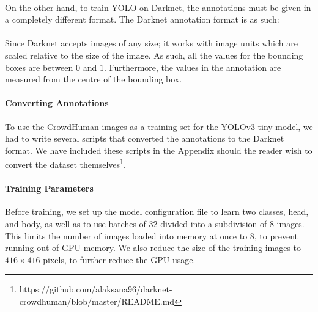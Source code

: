 \paragraph{}  

\paragraph{}On the other hand, to train YOLO on Darknet, the annotations must be given in a completely different format. The Darknet annotation format is as such:

\paragraph{}

\paragraph{}Since Darknet accepts images of any size; it works with image units which are scaled relative to the size of the image. As such, all the values for the bounding boxes are between $0$ and $1$. Furthermore, the  values in the annotation are measured from the centre of the bounding box.  

\paragraph{Converting Annotations} To use the CrowdHuman images as a training set for the YOLOv3-tiny model, we had to write several scripts that converted the annotations to the Darknet format. We have included these scripts in the Appendix should the reader wish to convert the dataset themselves\footnote{https://github.com/alaksana96/darknet-crowdhuman/blob/master/README.md}.

\paragraph{Training Parameters} Before training, we set up the model configuration file to learn two classes, head, and body, as well as to use batches of 32 divided into a subdivision of 8 images. This limits the number of images loaded into memory at once to 8, to prevent running out of GPU memory. We also reduce the size of the training images to $416\times 416$ pixels, to further reduce the GPU usage. \\

